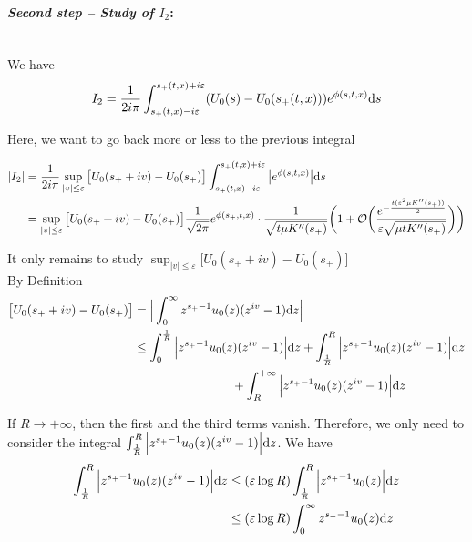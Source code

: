 \documentclass[11pt]{amsart}
\begin{document}
\medskip
\paragraph{\textit{Second step -- Study of $I_2$}:}\mbox{}\\
We have 
    \begin{equation*}
        I_2 = \frac{1}{2i \pi} \int_{s_+(t,x) - i\varepsilon}^{s_+(t,x) + i\varepsilon} (U_0(s) -  U_0(s_+(t,x)))  e^{\phi(s,t,x)} \mathrm ds 
    \end{equation*}
    
Here, we want to go back more or less to the previous integral

    \begin{align*}
         |I_2| 
         &= 
         \frac{1}{2i \pi} \sup_{|v| \leq \varepsilon} \big[U_0(s_+ + iv) -  U_0(s_+) \big] \int_{s_+(t,x) - i\varepsilon}^{s_+(t,x) + i\varepsilon} \big| e^{\phi(s,t,x)} \big| \mathrm ds \\
         &=
         \sup_{|v| \leq \varepsilon} \big[U_0(s_+ + iv) -  U_0(s_+) \big] \frac{1}{\sqrt{2\pi}} e^{\phi(s_+, t, x)} \cdot \frac{1}{\sqrt{t \mu K''(s_+)}} \bigg( 
    1 + \mathcal{O}\bigg(\frac{e^{-\frac{t(\varepsilon^2 \mu K''(s_+))}{2}} }{\varepsilon \sqrt{\mu tK''(s_+)}}\bigg) \bigg)
    \end{align*}
    
It only remains to study $  \sup_{|v| \leq \varepsilon} \big[U_0(s_+ + iv) -  U_0(s_+) \big]$ \\

By Definition
\begin{align*}
    \big[U_0(s_+ + iv) -  U_0(s_+) \big]
    &= \Big| \int_0^\infty  z^{s_+ - 1}u_0(z) (z^{iv} - 1) \mathrm dz \Big| \\
    &\leq \int_0^{\frac{1}{R}} \Big|  z^{s_+ - 1}u_0(z) (z^{iv} - 1) \Big| \mathrm dz
        + \int_{\frac{1}{R}}^R \Big|  z^{s_+ - 1}u_0(z) (z^{iv} - 1) \Big| \mathrm dz \\
        &\qquad \qquad \qquad \qquad
        + \int_R^{+\infty} \Big|  z^{s_+ - 1}u_0(z) (z^{iv} - 1) \Big| \mathrm dz \\
\end{align*}

If $R \to + \infty$, then the first and the third terms vanish. Therefore, we only need to consider the integral $ \int_{\frac{1}{R}}^R \Big|  z^{s_+ - 1}u_0(z) (z^{iv} - 1) \Big| \mathrm dz$. We have
    \begin{align*}
         \int_{\frac{1}{R}}^R \Big|  z^{s_+ - 1}u_0(z) (z^{iv} - 1) \Big| \mathrm dz 
         &\leq 
          (\varepsilon \log R)\int_{\frac{1}{R}}^R \Big|  z^{s_+ - 1}u_0(z) \Big| \mathrm dz \\
         &\leq 
          (\varepsilon \log R)\int_{0}^{\infty} z^{s_+ - 1}u_0(z)  \mathrm dz \\
    \end{align*}
\end{document}

